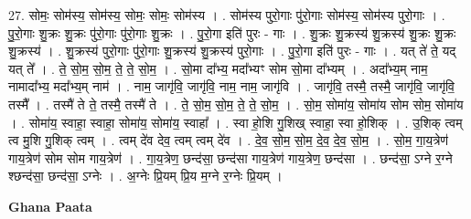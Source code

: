 \documentclass[17pt]{extarticle}
\begin{document}
27. सोमः॒ सोम॑स्य॒ सोम॑स्य॒ सोमः॒ सोमः॒ सोम॑स्य । . सोम॑स्य पुरो॒गाः पु॑रो॒गाः सोम॑स्य॒ सोम॑स्य पुरो॒गाः । . पु॒रो॒गाः शु॒क्रः शु॒क्रः पु॑रो॒गाः पु॑रो॒गाः शु॒क्रः । . पु॒रो॒गा इति॑ पुरः - गाः । . शु॒क्रः शु॒क्रस्य॑ शु॒क्रस्य॑ शु॒क्रः शु॒क्रः शु॒क्रस्य॑ । . शु॒क्रस्य॑ पुरो॒गाः पु॑रो॒गाः शु॒क्रस्य॑ शु॒क्रस्य॑ पुरो॒गाः । . पु॒रो॒गा इति॑ पुरः - गाः । . यत् ते॑ ते॒ यद् यत् ते᳚ । . ते॒ सो॒म॒ सो॒म॒ ते॒ ते॒ सो॒म॒ । . सो॒मा दा᳚भ्य॒ मदा᳚भ्यꣳ सोम सो॒मा दा᳚भ्यम् । . अदा᳚भ्य॒म् नाम॒ नामादा᳚भ्य॒ मदा᳚भ्य॒म् नाम॑ । . नाम॒ जागृ॑वि॒ जागृ॑वि॒ नाम॒ नाम॒ जागृ॑वि । . जागृ॑वि॒ तस्मै॒ तस्मै॒ जागृ॑वि॒ जागृ॑वि॒ तस्मै᳚ । . तस्मै॑ ते ते॒ तस्मै॒ तस्मै॑ ते । . ते॒ सो॒म॒ सो॒म॒ ते॒ ते॒ सो॒म॒ । . सो॒म॒ सोमा॑य॒ सोमा॑य सोम सोम॒ सोमा॑य । . सोमा॑य॒ स्वाहा॒ स्वाहा॒ सोमा॑य॒ सोमा॑य॒ स्वाहा᳚ । . स्वा हो॒शि गु॒शिख् स्वाहा॒ स्वा हो॒शिक् । . उ॒शिक् त्वम् त्व मु॒शि गु॒शिक् त्वम् । . त्वम् दे॑व देव॒ त्वम् त्वम् दे॑व । . दे॒व॒ सो॒म॒ सो॒म॒ दे॒व॒ दे॒व॒ सो॒म॒ । . सो॒म॒ गा॒य॒त्रेण॑ गाय॒त्रेण॑ सोम सोम गाय॒त्रेण॑ । . गा॒य॒त्रेण॒ छन्द॑सा॒ छन्द॑सा गाय॒त्रेण॑ गाय॒त्रेण॒ छन्द॑सा । . छन्द॑सा॒ ऽग्ने र॒ग्ने श्छन्द॑सा॒ छन्द॑सा॒ ऽग्नेः । . अ॒ग्नेः प्रि॒यम् प्रि॒य म॒ग्ने र॒ग्नेः प्रि॒यम् । \newline

\textbf{Ghana Paata } \newline
\end{document}
